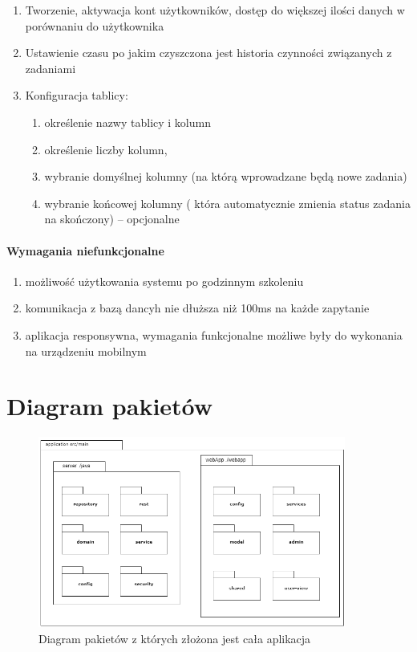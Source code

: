 		\begin{enumerate} 
		\item Tworzenie, aktywacja kont użytkowników, dostęp do większej ilości danych w porównaniu do użytkownika
		\item Ustawienie czasu po jakim czyszczona jest historia czynności związanych z zadaniami
		\item Konfiguracja tablicy:
	\begin{enumerate}[leftmargin=3em]
			\item określenie nazwy tablicy i kolumn
			\item określenie liczby kolumn, 
			\item wybranie domyślnej kolumny (na którą wprowadzane będą nowe zadania)
			\item wybranie końcowej kolumny ( która automatycznie zmienia status zadania na skończony) –  opcjonalne
		\end{enumerate}

\end{enumerate}

\paragraph{Wymagania niefunkcjonalne}
\begin{enumerate}
	\item możliwość użytkowania systemu po godzinnym szkoleniu
	\item komunikacja z bazą dancyh nie dłuższa niż 100ms na każde zapytanie 
	\item aplikacja responsywna, wymagania funkcjonalne możliwe były do wykonania na urządzeniu mobilnym
\end{enumerate}

\clearpage
\section{Diagram pakietów}


\begin{figure}[h]
	
	\centering
	\includegraphics[width=0.90\textwidth]{pakiety}		
	\caption{Diagram pakietów z których złożona jest cała aplikacja }
	\label{pakiet}
\end{figure}

